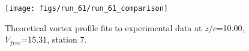 \begin{figure}[H]
\centering
\texttt{[image: figs/run\_61/run\_61\_comparison]}
\caption{Theoretical vortex profile fits to experimental data at $z/c$=10.00, $V_{free}$=15.31, station 7.}
\label{fig:run_61_comparison}
\end{figure}


